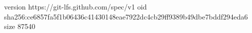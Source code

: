 version https://git-lfs.github.com/spec/v1
oid sha256:ce6857fa5f1b06436c41430148eae7922dc4cb29ff9389b49dbe7bddf294eda6
size 87540

